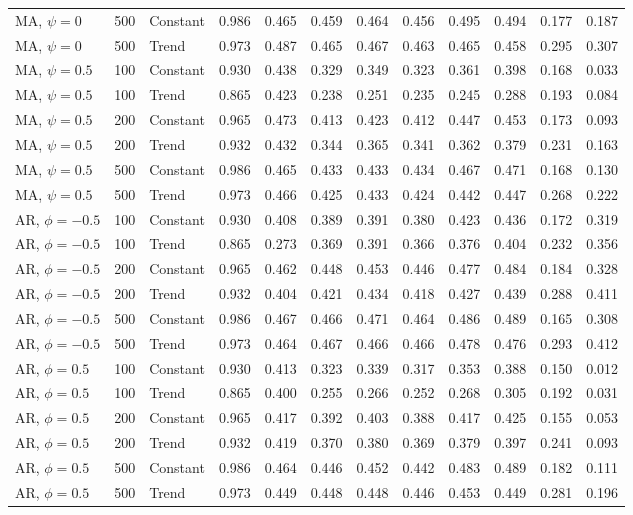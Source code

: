 \begin{tabular}{lrlccccccccc}
MA, $\psi = 0$ & 500 & Constant & 0.986 & 0.465 & 0.459 & 0.464 & 0.456 & 0.495 & 0.494 & 0.177 & 0.187 \\
MA, $\psi = 0$ & 500 & Trend & 0.973 & 0.487 & 0.465 & 0.467 & 0.463 & 0.465 & 0.458 & 0.295 & 0.307 \\
\addlinespace
MA, $\psi = 0.5$ & 100 & Constant & 0.930 & 0.438 & 0.329 & 0.349 & 0.323 & 0.361 & 0.398 & 0.168 & 0.033 \\
MA, $\psi = 0.5$ & 100 & Trend & 0.865 & 0.423 & 0.238 & 0.251 & 0.235 & 0.245 & 0.288 & 0.193 & 0.084 \\
MA, $\psi = 0.5$ & 200 & Constant & 0.965 & 0.473 & 0.413 & 0.423 & 0.412 & 0.447 & 0.453 & 0.173 & 0.093 \\
MA, $\psi = 0.5$ & 200 & Trend & 0.932 & 0.432 & 0.344 & 0.365 & 0.341 & 0.362 & 0.379 & 0.231 & 0.163 \\
MA, $\psi = 0.5$ & 500 & Constant & 0.986 & 0.465 & 0.433 & 0.433 & 0.434 & 0.467 & 0.471 & 0.168 & 0.130 \\
MA, $\psi = 0.5$ & 500 & Trend & 0.973 & 0.466 & 0.425 & 0.433 & 0.424 & 0.442 & 0.447 & 0.268 & 0.222 \\
\addlinespace
AR, $\phi = -0.5$ & 100 & Constant & 0.930 & 0.408 & 0.389 & 0.391 & 0.380 & 0.423 & 0.436 & 0.172 & 0.319 \\
AR, $\phi = -0.5$ & 100 & Trend & 0.865 & 0.273 & 0.369 & 0.391 & 0.366 & 0.376 & 0.404 & 0.232 & 0.356 \\
AR, $\phi = -0.5$ & 200 & Constant & 0.965 & 0.462 & 0.448 & 0.453 & 0.446 & 0.477 & 0.484 & 0.184 & 0.328 \\
AR, $\phi = -0.5$ & 200 & Trend & 0.932 & 0.404 & 0.421 & 0.434 & 0.418 & 0.427 & 0.439 & 0.288 & 0.411 \\
AR, $\phi = -0.5$ & 500 & Constant & 0.986 & 0.467 & 0.466 & 0.471 & 0.464 & 0.486 & 0.489 & 0.165 & 0.308 \\
AR, $\phi = -0.5$ & 500 & Trend & 0.973 & 0.464 & 0.467 & 0.466 & 0.466 & 0.478 & 0.476 & 0.293 & 0.412 \\
\addlinespace
AR, $\phi = 0.5$ & 100 & Constant & 0.930 & 0.413 & 0.323 & 0.339 & 0.317 & 0.353 & 0.388 & 0.150 & 0.012 \\
AR, $\phi = 0.5$ & 100 & Trend & 0.865 & 0.400 & 0.255 & 0.266 & 0.252 & 0.268 & 0.305 & 0.192 & 0.031 \\
AR, $\phi = 0.5$ & 200 & Constant & 0.965 & 0.417 & 0.392 & 0.403 & 0.388 & 0.417 & 0.425 & 0.155 & 0.053 \\
AR, $\phi = 0.5$ & 200 & Trend & 0.932 & 0.419 & 0.370 & 0.380 & 0.369 & 0.379 & 0.397 & 0.241 & 0.093 \\
AR, $\phi = 0.5$ & 500 & Constant & 0.986 & 0.464 & 0.446 & 0.452 & 0.442 & 0.483 & 0.489 & 0.182 & 0.111 \\
AR, $\phi = 0.5$ & 500 & Trend & 0.973 & 0.449 & 0.448 & 0.448 & 0.446 & 0.453 & 0.449 & 0.281 & 0.196 \\
\bottomrule
\end{tabular}
